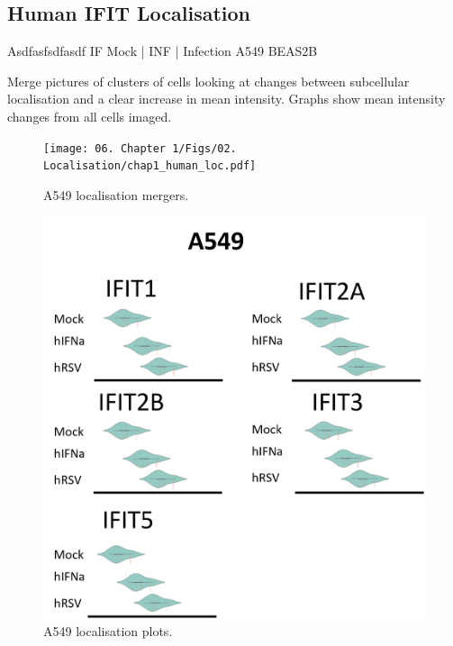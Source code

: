 \subsection{Human IFIT Localisation} \label{subsec:Human IFIT Localisation}
Asdfasfsdfasdf \newline
IF Mock | INF | Infection \newline
A549 BEAS2B

Merge pictures of clusters of cells looking at changes between subcellular localisation and a clear increase in mean intensity. Graphs show mean intensity changes from all cells imaged.

\begin{figure}
    \centering
    \texttt{[image: 06. Chapter 1/Figs/02. Localisation/chap1\_human\_loc.pdf]}
    \caption[A549 localisation mergers.]{A549 localisation mergers.}
    \label{fig:A549 localisation mergers.}
\end{figure}


\begin{figure}
    \centering
    \includegraphics[width=1\linewidth]{06. Chapter 1/Figs/02. Localisation/02. a549 plots.png}
    \caption[A549 localisation plots.]{A549 localisation plots.}
    \label{fig:A549 localisation plots.}
\end{figure}




